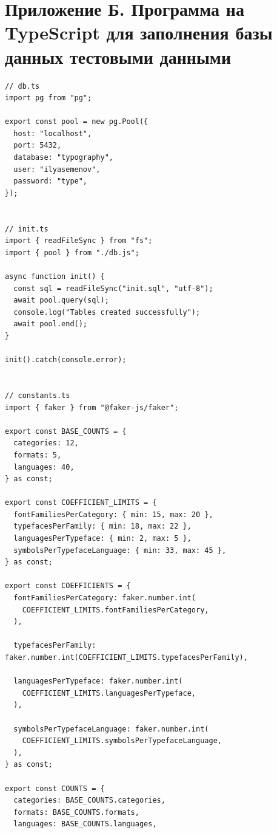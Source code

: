 \section*{Приложение Б. Программа на TypeScript для заполнения базы данных тестовыми данными}
\label{app:seed-ts}

\renewcommand{\theFancyVerbLine}{%
    \scriptsize\ttfamily\textcolor{gray}{\arabic{FancyVerbLine}}%
}

\begin{verbatim}
// db.ts
import pg from "pg";

export const pool = new pg.Pool({
  host: "localhost",
  port: 5432,
  database: "typography",
  user: "ilyasemenov",
  password: "type",
});


// init.ts
import { readFileSync } from "fs";
import { pool } from "./db.js";

async function init() {
  const sql = readFileSync("init.sql", "utf-8");
  await pool.query(sql);
  console.log("Tables created successfully");
  await pool.end();
}

init().catch(console.error);


// constants.ts
import { faker } from "@faker-js/faker";

export const BASE_COUNTS = {
  categories: 12,
  formats: 5,
  languages: 40,
} as const;

export const COEFFICIENT_LIMITS = {
  fontFamiliesPerCategory: { min: 15, max: 20 },
  typefacesPerFamily: { min: 18, max: 22 },
  languagesPerTypeface: { min: 2, max: 5 },
  symbolsPerTypefaceLanguage: { min: 33, max: 45 },
} as const;

export const COEFFICIENTS = {
  fontFamiliesPerCategory: faker.number.int(
    COEFFICIENT_LIMITS.fontFamiliesPerCategory,
  ),

  typefacesPerFamily: faker.number.int(COEFFICIENT_LIMITS.typefacesPerFamily),

  languagesPerTypeface: faker.number.int(
    COEFFICIENT_LIMITS.languagesPerTypeface,
  ),

  symbolsPerTypefaceLanguage: faker.number.int(
    COEFFICIENT_LIMITS.symbolsPerTypefaceLanguage,
  ),
} as const;

export const COUNTS = {
  categories: BASE_COUNTS.categories,
  formats: BASE_COUNTS.formats,
  languages: BASE_COUNTS.languages,


\end{verbatim}
